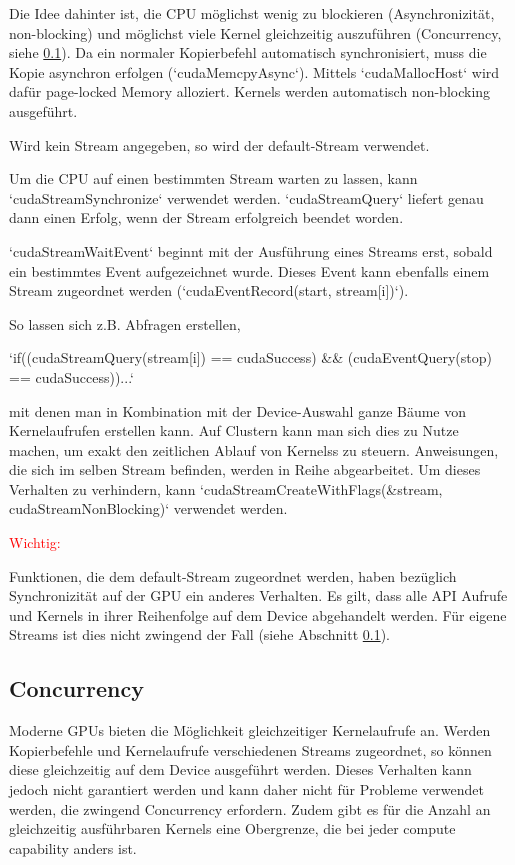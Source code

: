 		Die Idee dahinter ist, die CPU möglichst wenig zu blockieren (Asynchronizität, non-blocking) und möglichst viele \Gls{Kernel} gleichzeitig auszuführen (Concurrency, siehe \ref{async}). Da ein normaler Kopierbefehl automatisch synchronisiert, muss die Kopie asynchron erfolgen (\li`cudaMemcpyAsync`). Mittels \li`cudaMallocHost` wird dafür \gls{page-locked Memory} alloziert. \Glspl{Kernel} werden automatisch non-blocking ausgeführt.
		
		Wird kein \Gls{Stream} angegeben, so wird der default-\Gls{Stream} verwendet.
		
		Um die CPU auf einen bestimmten \Gls{Stream} warten zu lassen, kann \li`cudaStreamSynchronize` verwendet werden. \li`cudaStreamQuery` liefert genau dann einen Erfolg, wenn der \Gls{Stream} erfolgreich beendet worden.	
		
		\li`cudaStreamWaitEvent` beginnt mit der Ausführung eines \Glspl{Stream} erst, sobald ein bestimmtes Event aufgezeichnet wurde. Dieses Event kann ebenfalls einem \Gls{Stream} zugeordnet werden (\li`cudaEventRecord(start, stream[i])`).
		
		So lassen sich z.B. Abfragen erstellen,
		
		\li`if((cudaStreamQuery(stream[i]) == cudaSuccess) && (cudaEventQuery(stop) == cudaSuccess))...`
		
		mit denen man in Kombination mit der Device-Auswahl ganze Bäume von \Gls{Kernel}aufrufen erstellen kann. Auf Clustern kann man sich dies zu Nutze machen, um exakt den zeitlichen Ablauf von \Glspl{Kernel}s zu steuern. Anweisungen, die sich im selben \Gls{Stream} befinden, werden in Reihe abgearbeitet. Um dieses Verhalten zu verhindern, kann \li`cudaStreamCreateWithFlags(&stream, cudaStreamNonBlocking)` verwendet werden.
		
		\textcolor{red}{Wichtig:}
		
		Funktionen, die dem default-\Gls{Stream} zugeordnet werden, haben bezüglich Synchronizität auf der GPU ein anderes Verhalten. Es gilt, dass alle \Gls{API} Aufrufe und \Glspl{Kernel} in ihrer Reihenfolge auf dem Device abgehandelt werden. Für eigene \Glspl{Stream} ist dies nicht zwingend der Fall (siehe Abschnitt \ref{async}).
		
		\subsection{Concurrency}\label{async}
		Moderne GPUs bieten die Möglichkeit gleichzeitiger \Gls{Kernel}aufrufe an. Werden Kopierbefehle und \Gls{Kernel}aufrufe verschiedenen \Glspl{Stream} zugeordnet, so können diese gleichzeitig auf dem Device ausgeführt werden. Dieses Verhalten kann jedoch nicht garantiert werden und kann daher nicht für Probleme verwendet werden, die zwingend Concurrency erfordern. Zudem gibt es für die Anzahl an gleichzeitig ausführbaren \Glspl{Kernel} eine Obergrenze, die bei jeder \Gls{compute capability} anders ist.
		
